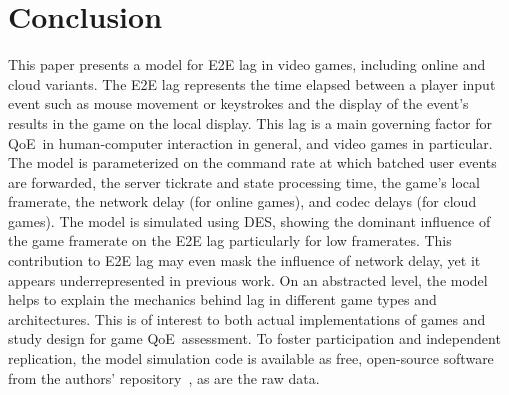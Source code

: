 \section{Conclusion}
\label{sec:conclusion}


This paper presents a model for \acrfull{E2E} lag in video games, including online and cloud variants. The \gls{E2E} lag represents the time elapsed between a player input event such as mouse movement or keystrokes and the display of the event's results in the game on the local display. This lag is a main governing factor for \acrfull{QoE} in human-computer interaction in general, and video games in particular. The model is parameterized on the command rate at which batched user events are forwarded, the server tickrate and state processing time, the game's local framerate, the network delay (for online games), and codec delays (for cloud games). %
The model is simulated using \acrfull{DES}, showing the dominant influence of the game framerate on the \gls{E2E} lag particularly for low framerates. This contribution to \gls{E2E} lag may even mask the influence of network delay, yet it appears underrepresented in previous work.  On an abstracted level, the model helps to explain the mechanics behind lag in different game types and architectures. This is of interest to both actual implementations of games and study design for game \gls{QoE} assessment. To foster participation and independent replication, the model simulation code is available as free, open-source software from the authors' repository~\cite{onlinegame-lag-sim-repo}, as are the raw data.
%
%
%
%
